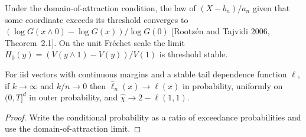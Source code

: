 \begin{theorem}
  \label{thm:mgpd}
  \leanok
  Under the domain-of-attraction condition, the law of $(X - b_n)/a_n$ given that some coordinate exceeds its threshold
  converges to $(\log G(x \wedge 0) - \log G(x))/\log G(0)$ [Rootz\'en and Tajvidi 2006, Theorem~2.1]. On the unit Fr\'echet
  scale the limit $H_0(y) = (V(y \wedge 1) - V(y))/V(1)$ is threshold stable.
\end{theorem}

\begin{theorem}
  \label{thm:stable-tail-dependence-consistent}
  \leanok
  For iid vectors with continuous margins and a stable tail dependence function $\ell$, if $k \to \infty$ and $k/n \to 0$ then $\hat\ell_n(x) \to \ell(x)$ in probability, uniformly on $(0,T]^d$ in outer probability, and $\hat\chi \to 2 - \ell(1,1)$.
\end{theorem}
\begin{proof}
  \leanok
  Write the conditional probability as a ratio of exceedance probabilities and use the domain-of-attraction limit.
\end{proof}
